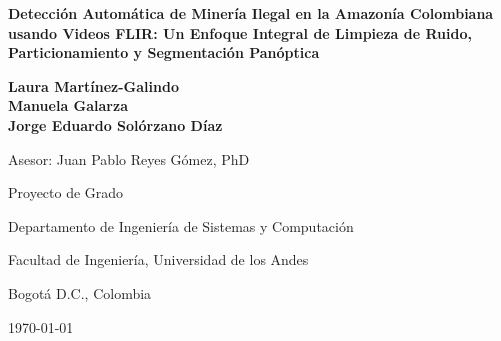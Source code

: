 \documentclass[12pt,letterpaper]{article}
\begin{document}
\begin{titlepage}
    \centering
    \vspace*{0.2cm}

    \begin{figure}[H]
        \centering
    \end{figure}

    \vspace{1.6cm}

    {\Large \bfseries Detección Automática de Minería Ilegal en la Amazonía Colombiana usando Videos FLIR: Un Enfoque Integral de Limpieza de Ruido, Particionamiento y Segmentación Panóptica \par}

    \vspace{2.2cm}

    {\large \textbf{Laura Martínez-Galindo \\ Manuela Galarza \\ Jorge Eduardo Solórzano Díaz} \par}
    \vspace{0.4cm}
    {\normalsize Asesor: Juan Pablo Reyes Gómez, PhD \par}

    \vfill

    {\normalsize Proyecto de Grado \par}
    \vspace{0.25cm}
    {\normalsize Departamento de Ingeniería de Sistemas y Computación \par}
    {\normalsize Facultad de Ingeniería, Universidad de los Andes \par}
    {\normalsize Bogotá D.C., Colombia \par}
    \vspace{0.35cm}
    {\normalsize \today \par}
    \vspace*{0.5cm}
\end{titlepage}

\tableofcontents
\newpage













\printbibliography
\end{document}
